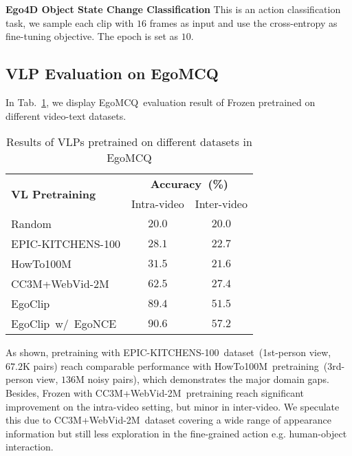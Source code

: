 \documentclass{article}
\newcommand{\dataset}{EgoClip}
\newcommand{\model}{EgoNCE\xspace}
\newcommand{\eval}{EgoMCQ}
\newcommand{\epic}{EPIC-KITCHENS-100}
\newcommand{\ossc}{Object State Change Classification}
\newcommand{\ccweb}{CC3M+WebVid-2M}
\newcommand{\howto}{HowTo100M}
\begin{document}
\noindent\textbf{Ego4D \ossc}
This is an action classification task, we sample each clip with $16$ frames as input and use the cross-entropy as fine-tuning objective. The epoch is set as $10$.

\subsection{VLP Evaluation on \eval}
In Tab.~\ref{egomcq_eval}, we display \eval~evaluation result of Frozen pretrained on different video-text datasets.
\begin{table}[htb]
\centering
\vspace{-1em}
\begin{tabular}{l|cc}
    \toprule[1pt] 
	\multicolumn{1}{l|}{\multirow{2}{*}{\textbf{VL Pretraining}}} &  \multicolumn{2}{c}{\textbf{Accuracy~(\%)}} \\
	 & Intra-video      & Inter-video       \\ \midrule[1pt] 
	Random &  $20.0$ & $20.0$   \\ 	\midrule
	\epic &  $28.1$ & $22.7$   \\
    \howto &  $31.5$ & $21.6$   \\
	\ccweb  & $62.5$ & $27.4$   \\ \midrule
	\dataset &  $89.4$ & $51.5$   \\
    \dataset~w/~\model  &  $90.6$ & $57.2$   \\
	\bottomrule[1pt]
\end{tabular}
\vspace{0.4em}
\caption{Results of VLPs pretrained on different datasets in \eval}
\vspace{-2em}
\label{egomcq_eval}
\end{table} 
As shown, pretraining with \epic~dataset~(1st-person view, $67.2\text{K}$ pairs) reach comparable performance with \howto~pretraining~(3rd-person view, $136\text{M}$ noisy pairs), which demonstrates the major domain gaps. 
Besides, Frozen with \ccweb~pretraining reach significant improvement on the intra-video setting, but minor in inter-video. 
We speculate this due to \ccweb~dataset covering a wide range of appearance information but still less exploration in the fine-grained action e.g. human-object interaction.
\end{document}
